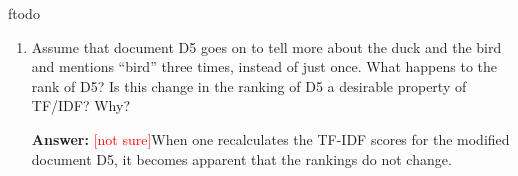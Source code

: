 ƒtodo\documentclass{article}
\newenvironment{QandA}{\begin{enumerate}[label=\arabic*.]}{\end{enumerate}}
\newenvironment{InnerQandA}{\begin{enumerate}[label=\roman*.]}{\end{enumerate}}
\newenvironment{answer}{\par\normalfont \textbf{Answer:}}{}
\newcommand{\notsure}{\textcolor{red}{[not sure]}}
\begin{document}
\begin{QandA}
\begin{InnerQandA}
\begin{answer}
            Now, we calculate the cosine similarities between the TF-IDF scores in order to obtain a ranking of the document similarity:
            \begin{align*}
                \cos \left( \text{Q}, \text{D1} \right) &= 0 \\
                \cos \left( \text{Q}, \text{D2} \right) &= 0.73 \\
                \cos \left( \text{Q}, \text{D3} \right) &= 0.63 \\
                \cos \left( \text{Q}, \text{D4} \right) &= 0.82 \\
                \cos \left( \text{Q}, \text{D5} \right) &= 0.54
            \end{align*}
            We obtain that the two most similar documents to Q are D4 and D2. However, one could argue that those two documents are not most relevant to the query Q, since D3 and D5 are semantically somewhat closer in meaning.
        \end{answer}

        \item Assume that document D5 goes on to tell more about the duck and the bird and mentions ``bird'' three times, instead of just once. What happens to the rank of D5? Is this change in the ranking of D5 a desirable property of TF/IDF? Why?
        \begin{answer}
            \notsure When one recalculates the TF-IDF scores for the modified document D5, it becomes apparent that the rankings do not change. 
        \end{answer}
    \end{InnerQandA}


\end{QandA}
\end{document}
